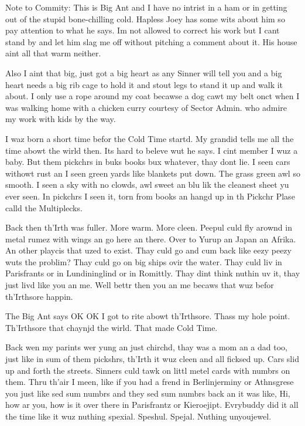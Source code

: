 \documentclass[10pt,a4paper]{article}
\begin{document}
Note to Commity: This is Big Ant and I have no intrist in a ham or in getting out of the stupid bone-chilling cold. Hapless Joey has some wits about him so pay attention to what he says. Im not allowed to correct his work but I cant stand by and let him slag me off without pitching a comment about it. His house aint all that warm neither.

Also I aint that big, just got a big heart as any Sinner will tell you and a big heart needs a big rib cage to hold it and stout legs to stand it up and walk it about. I only use a rope around my coat becawse a dog cawt my belt onct when I was walking home with a chicken curry courtesy of Sector Admin. who admire my work with kids by the way.

I waz born a short time befor the Cold Time startd. My grandid tells me all the time abowt the wirld then. Its hard to beleve wut he says. I cint member I wuz a baby. But them pickchrs in buks books bux whatever, thay dont lie. I seen cars withowt rust an I seen green yards like blankets put down. The grass green awl so smooth. I seen a sky with no clowds, awl sweet an blu lik the cleanest sheet yu ever seen. In pickchrs I seen it, torn from books an hangd up in th Pickchr Plase calld the Multiplecks.

Back then th’Irth was fuller. More warm. More cleen. Peepul culd fly arownd in metal rumez with wings an go here an there. Over to Yurup an Japan an Afrika. An other playcis that uzed to exist. Thay culd go and cum back like eezy peezy wuts the problim? Thay culd go on big ships ovir the water. Thay culd liv in Parisfrants or in Lundininglind or in Romittly. Thay dint think nuthin uv it, thay just livd like you an me. Well bettr then you an me becaws that wuz befor th’Irthsore happin.

The Big Ant says OK OK I got to rite abowt th’Irthsore. Thass my hole point. Th’Irthsore that chaynjd the wirld. That made Cold Time.

Back wen my parints wer yung an just chirchd, thay was a mom an a dad too, just like in sum of them pickshrs, th’Irth it wuz cleen and all ficksed up. Cars slid up and forth the streets. Sinners culd tawk on littl metel cards with numbrs on them. Thru th’air I meen, like if you had a frend in Berlinjerminy or Athnsgrese you just like sed sum numbrs and they sed sum numbrs back an it was like, Hi, how ar you, how is it over there in Parisfrantz or Kieroejipt. Evrybuddy did it all the time like it wuz nuthing spexial. Speshul. Spejal. Nuthing unyoujewel.
\end{document}
